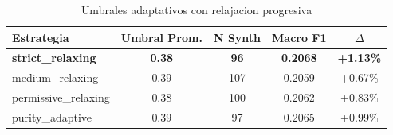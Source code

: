 
\begin{table}[h]
\centering
\caption{Umbrales adaptativos con relajacion progresiva}
\label{tab:adaptive_thresholds_v2}
\begin{tabular}{lcccc}
\hline
Estrategia & Umbral Prom. & N Synth & Macro F1 & $\Delta$ \\
\hline
\textbf{strict_relaxing} & \textbf{0.38} & \textbf{96} & \textbf{0.2068} & \textbf{+1.13\%} \\
medium_relaxing & 0.39 & 107 & 0.2059 & +0.67\% \\
permissive_relaxing & 0.38 & 100 & 0.2062 & +0.83\% \\
purity_adaptive & 0.39 & 97 & 0.2065 & +0.99\% \\

\hline
\end{tabular}
\end{table}
